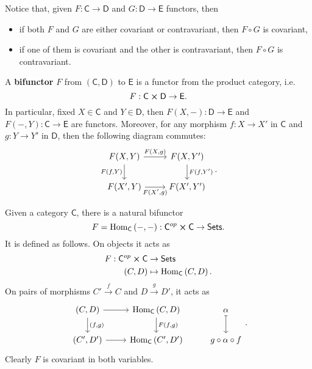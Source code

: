 \begin{rem}
	Notice that, given $F: \mathsf{C} \to \mathsf{D}$ and $G: \mathsf{D} \to \mathsf{E}$ functors, then
	\begin{itemize}
		\item if both $F$ and $G$ are either covariant or contravariant, then $F \circ G$ is covariant,
		\item if one of them is covariant and the other is contravariant, then $F \circ G$ is contravariant.
	\end{itemize}
\end{rem}

\begin{defn}[Bifunctor]
	A \textbf{bifunctor} $F$ from $\left(\mathsf{C}, \mathsf{D}\right)$ to $\mathsf{E}$ is a functor from the product category, i.e.
	\begin{equation}
	F: \mathsf{C}\cross \mathsf{D} \to \mathsf{E} 
	.\end{equation}
	In particular, fixed $X \in \mathsf{C}$ and $Y \in \mathsf{D}$,
	then $F \left(X, - \right): \mathsf{D} \to \mathsf{E}$ and
	$F \left( - , Y \right): \mathsf{C} \to \mathsf{E}$ are functors.
	Moreover, for any morphism $f: X \to X'$ in $\mathsf{C}$ and
	$g: Y \to Y'$ in $\mathsf{D}$, then the following diagram commutes:
	\begin{equation}
	\begin{tikzcd}
		F(X,Y) \arrow[r, "{F(X,g)}", rightarrow]\arrow[d, "{F(f,Y)}"', rightarrow] & F(X,Y')\arrow[d, "{F(f,Y')}", rightarrow] \\
		F(X',Y) \arrow[r, "{F(X',g)}"', rightarrow] & F(X',Y')
	\end{tikzcd}
	.\end{equation} 
\end{defn}

\begin{ex}
	Given a category $\mathsf{C}$, there is a natural bifunctor
	\begin{equation}
	F = \mathrm{Hom}_{\mathsf{C}} \left( -, - \right): \mathsf{C}^{op} \cross \mathsf{C} \to \mathsf{Sets}
	.\end{equation} 
	It is defined as follows.
	On objects it acts as
	\begin{align}
		F: \mathsf{C}^{op} \cross \mathsf{C} &\to \mathsf{Sets} \\
		\left(C, D\right) &\mapsto \mathrm{Hom}_{\mathsf{C}} \left( C, D \right)
	.\end{align} 
	On pairs of morphisms $C' \xrightarrow{f} C$ and $D \xrightarrow{g} D'$, it acts as
	\begin{equation}
	\begin{tikzcd}
		\left(C, D\right) \arrow[r, "", rightarrow] \arrow[d, "{(f,g)}", rightarrow] &
		\mathrm{Hom}_{\mathsf{C}} \left( C, D \right) \arrow[d, "{F(f,g)}", rightarrow] &
		\alpha \arrow[d, "", mapsto]\\
		\left(C', D'\right) \arrow[r, "", rightarrow] &
		\mathrm{Hom}_{\mathsf{C}} \left( C', D' \right) &
		g \circ \alpha \circ f
	\end{tikzcd}
	.\end{equation} 
	Clearly $F$ is covariant in both variables.
\end{ex} 	

